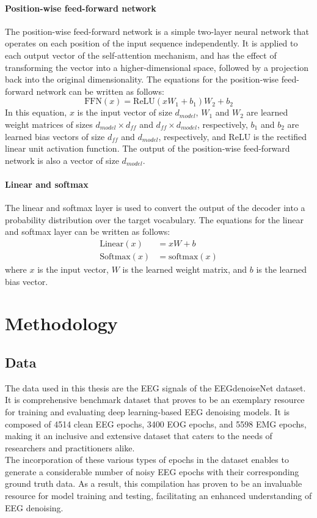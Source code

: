 \documentclass[a4paper]{sapthesis}
\begin{document}
\subsubsection{Position-wise feed-forward network}
The position-wise feed-forward network is a simple two-layer neural 
network that operates on each position of the input sequence 
independently. It is applied to each output vector of the self-attention
 mechanism, and has the effect of transforming the vector into a 
 higher-dimensional space, followed by a projection back into the
  original dimensionality.\newline
The equations for the position-wise feed-forward network can be written
 as follows:
 $$\text{FFN}(x) = \text{ReLU}(xW_1+b_1)W_2+b_2$$
 In this equation, $x$ is the input vector of size $d_{model}$,
  $W_1$ and $W_2$ are learned weight matrices of sizes 
  $d_{model}\times d_{ff}$ and $d_{ff}\times d_{model}$,
respectively, $b_1$ and $b_2$ are learned bias vectors of
size $d_{ff}$ and $d_{model}$, respectively, and ReLU is the
rectified linear unit activation function. The output of the
position-wise feed-forward network is also a vector of size $d_{model}$.
\subsubsection{Linear and softmax}
The linear and softmax layer is used to convert the output of the decoder
 into a probability distribution over the target vocabulary. The equations for the
   linear and softmax layer can be written as follows:
   \begin{align*}
     \text{Linear}(x) &= xW+b \\
     \text{Softmax}(x) &= \text{softmax}(x)
     \end{align*}
where $x$ is the input vector, $W$ is the learned weight matrix, and $b$
  is the learned bias vector.
\chapter{Methodology}
\section{Data}\label{sec:data}
The data used in this thesis are the EEG signals of the EEGdenoiseNet 
dataset\cite{EEGdenoiseNet}. It is comprehensive benchmark dataset
 that proves to be an exemplary resource for training and evaluating
  deep learning-based EEG denoising models. It is composed of 4514 clean 
  EEG epochs, 3400 EOG epochs, and 5598 EMG epochs, making it an inclusive 
  and extensive dataset that caters to the needs of researchers and
 practitioners alike.\newline \\
The incorporation of these various types of epochs in the dataset
enables to generate a considerable number of noisy EEG epochs
with their corresponding ground truth data. As a result, this compilation 
has proven to be an invaluable resource for model training and testing,
 facilitating an enhanced understanding of EEG denoising.
\end{document}
